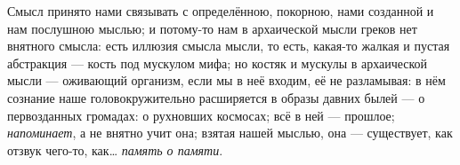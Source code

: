 \documentclass[12pt,a4paper,oneside]{book}
\begin{document}
Смысл принято нами связывать с определённою, покорною, нами созданной и нам послушною мыслью; и потому-то нам в архаической мысли греков нет внятного смысла: есть иллюзия смысла мысли, то есть, какая-то жалкая и пустая абстракция — кость под мускулом мифа; но костяк и мускулы в архаической мысли — оживающий организм, если мы в неё входим, её не разламывая: в нём сознание наше головокружительно расширяется в образы давних былей — о первозданных громадах: о рухновших космосах; всё в ней — прошлое; \emph{напоминает}, а не внятно учит она; взятая нашей мыслью, она — существует, как отзвук чего-то, как… \emph{память о памяти}.
\end{document}
